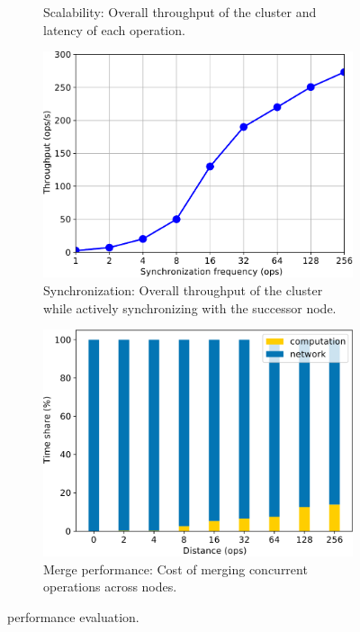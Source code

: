 \begin{figure}[t]
\begin{subfigure}{0.45\textwidth}
		\caption{Scalability: Overall throughput of the cluster and latency of each
			operation.}
		\label{grf:scalability}
	\end{subfigure}
	\par\bigskip
	\begin{subfigure}{0.45\textwidth}
		\includegraphics[width=\textwidth]{Graphs/synchronization.pdf}
		\caption{Synchronization: Overall throughput of the cluster while actively
			synchronizing with the successor node.}
		\label{grf:synchronization}
	\end{subfigure}
	\hfill
	\begin{subfigure}{0.45\textwidth}
		\includegraphics[width=\textwidth]{Graphs/merge.pdf}
		\caption{Merge performance: Cost of merging concurrent operations across
		nodes.}
		\label{grf:merge}
	\end{subfigure}
	\caption{\name performance evaluation.}
  \label{grf:evaluation}
\end{figure}

